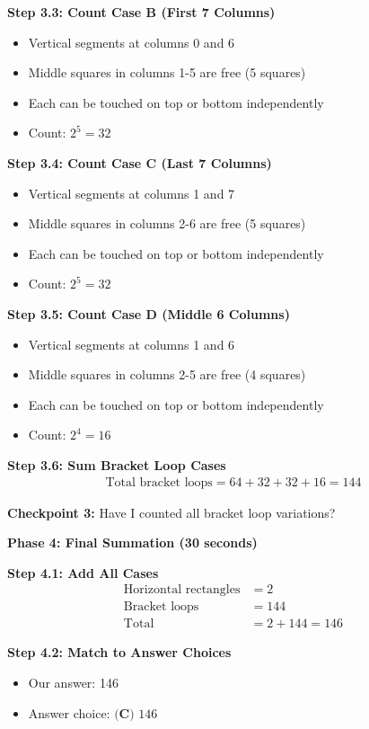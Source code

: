 \documentclass[12pt]{article}
\begin{document}
\begin{solutionbox}
\textbf{Step 3.3: Count Case B (First 7 Columns)}
\begin{itemize}
    \item Vertical segments at columns 0 and 6
    \item Middle squares in columns 1-5 are free (5 squares)
    \item Each can be touched on top or bottom independently
    \item Count: $2^5 = 32$
\end{itemize}

\textbf{Step 3.4: Count Case C (Last 7 Columns)}
\begin{itemize}
    \item Vertical segments at columns 1 and 7
    \item Middle squares in columns 2-6 are free (5 squares)
    \item Each can be touched on top or bottom independently
    \item Count: $2^5 = 32$
\end{itemize}

\textbf{Step 3.5: Count Case D (Middle 6 Columns)}
\begin{itemize}
    \item Vertical segments at columns 1 and 6
    \item Middle squares in columns 2-5 are free (4 squares)
    \item Each can be touched on top or bottom independently
    \item Count: $2^4 = 16$
\end{itemize}

\textbf{Step 3.6: Sum Bracket Loop Cases}
\begin{align*}
\text{Total bracket loops} = 64 + 32 + 32 + 16 = 144
\end{align*}

\textbf{Checkpoint 3:} Have I counted all bracket loop variations?

\textbf{Phase 4: Final Summation (30 seconds)}

\textbf{Step 4.1: Add All Cases}
\begin{align*}
\text{Horizontal rectangles} &= 2 \\
\text{Bracket loops} &= 144 \\
\text{Total} &= 2 + 144 = 146
\end{align*}

\textbf{Step 4.2: Match to Answer Choices}
\begin{itemize}
    \item Our answer: 146
    \item Answer choice: $\textbf{(C) } 146$
\end{itemize}


\end{solutionbox}
\end{document}
